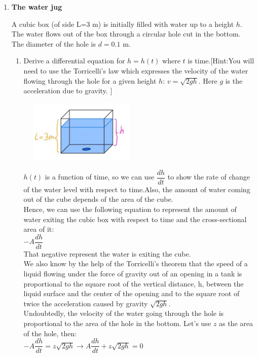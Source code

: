 \documentclass[fleqn]{article}
\begin{document}
\begin{enumerate}

  \item {\bf The water jug} 
  
  A cubic box (of side L=3 m) is initially filled with water up to a height  $h$. The water flows out of the box through a circular hole cut in the bottom. The diameter of the hole is $d=0.1$ m. 
  
  \begin{enumerate}
  
    \item Derive a differential equation for $h=h(t)$ where $t$ is time.[Hint:You will need to use the Torricelli's law which expresses the velocity of the water flowing through the hole for a given height  $h$:  $v=\sqrt{2 g h}$. Here $g$ is the acceleration due to gravity.  ]
    
    \includegraphics[height=3cm, width=6cm]{c.png}

    \textcolor{hwColor}{
      $h(t)$ is a function of time, so we can use $\dfrac{dh}{dt}$ to show the rate of change of the water level with respect to time.Also, the amount of water coming out of the cube depends of the area of the cube.\\
      Hence, we can use the following equation to represent the amount of water exiting the cubic box with respect to time and the cross-sectional area of it: \\
      $-A\dfrac{dh}{dt}$ \\
      That negative represent the water is exiting the cube.\\
      We also know by the help of the Torricelli’s theorem that the speed of a liquid flowing under the force of gravity out of an opening in a tank is proportional to the square root of the vertical distance, h, between the liquid surface and the center of the opening and to the square root of twice the acceleration caused by gravity $\sqrt{2gh}$.\\
      Undoubtedly, the velocity of the water going through the hole is proportional to the area of the hole in the bottom. Let's use $z$ as the area of the hole, then: \\
      $-A\dfrac{dh}{dt}=z\sqrt{2gh} \rightarrow A\dfrac{dh}{dt}+z\sqrt{2gh}=0$
    }


\end{enumerate}
\end{enumerate}
\end{document}
